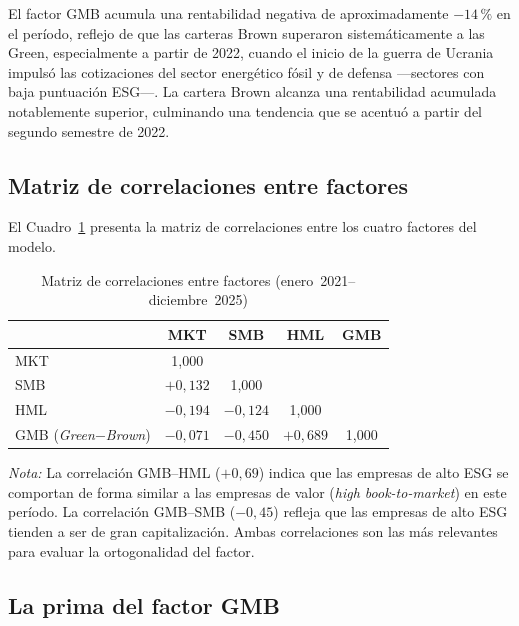 \documentclass[12pt, a4paper]{article}
\begin{document}
El factor GMB acumula una rentabilidad negativa de aproximadamente $-14\,\%$ en el
per\'iodo, reflejo de que las carteras Brown superaron sistem\'aticamente a las Green,
especialmente a partir de 2022, cuando el inicio de la guerra de Ucrania impuls\'o las
cotizaciones del sector energ\'etico f\'osil y de defensa ---sectores con baja puntuaci\'on
ESG---. La cartera Brown alcanza una rentabilidad acumulada notablemente superior,
culminando una tendencia que se acentu\'o a partir del segundo semestre de 2022.

\subsection{Matriz de correlaciones entre factores}
\label{subsec:correlaciones}

El Cuadro~\ref{tab:correlaciones} presenta la matriz de correlaciones entre los cuatro
factores del modelo.

\begin{table}[H]
  \centering
  \caption{Matriz de correlaciones entre factores (enero~2021--diciembre~2025)}
  \label{tab:correlaciones}
  \begin{tabular}{lcccc}
    \toprule
                        & MKT    & SMB    & HML    & GMB    \\
    \midrule
    MKT                 & 1{,}000 &        &        &        \\
    SMB                 & $+0{,}132$ & 1{,}000 &        &       \\
    HML                 & $-0{,}194$ & $-0{,}124$ & 1{,}000 &    \\
    GMB (\textit{Green}$-$\textit{Brown}) & $-0{,}071$ & $-0{,}450$ & $+0{,}689$ & 1{,}000 \\
    \bottomrule
  \end{tabular}
  \begin{minipage}{\linewidth}
    \small\vspace{0.3em}
    \textit{Nota:} La correlaci\'on GMB--HML ($+0{,}69$) indica que las empresas
    de alto ESG se comportan de forma similar a las empresas de valor
    (\textit{high book-to-market}) en este per\'iodo. La correlaci\'on GMB--SMB
    ($-0{,}45$) refleja que las empresas de alto ESG tienden a ser de gran
    capitalizaci\'on. Ambas correlaciones son las m\'as relevantes para evaluar la
    ortogonalidad del factor.
  \end{minipage}
\end{table}

\subsection{La prima del factor GMB}
\label{subsec:prima_gmb}
\end{document}
